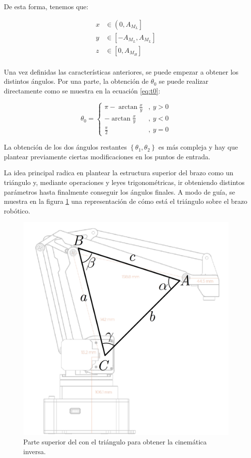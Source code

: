 De esta forma, tenemos que:

\begin{align*}
    x & \in \left(0, A_{M_L}\right]        \\
    y & \in \left[-A_{M_L}, A_{M_L}\right] \\
    z & \in \left[0, A_{M_H}\right]        \\
\end{align*}

Una vez definidas las características anteriores, se puede empezar a obtener los distintos
ángulos. Por una parte, la obtención de $\theta_0$ se puede realizar directamente como
se muestra en la ecuación \ref{eq:t0}:

\begin{equation}\label{eq:t0}
    \theta_0 = \left\{\begin{aligned}
        \pi - \arctan{\frac{x}{y}} & ,~y > 0 \\
        - \arctan{\frac{x}{y}}     & ,~y < 0 \\
        \frac{\pi}{2}              & ,~y = 0
    \end{aligned}
    \right.
\end{equation}

La obtención de los dos ángulos restantes $\left\{\theta_1, \theta_2\right\}$ es más
compleja y hay que plantear previamente ciertas modificaciones en los puntos de entrada.

La idea principal radica en plantear la estructura superior del brazo como un triángulo
y, mediante operaciones y leyes trigonométricas, ir obteniendo distintos parámetros hasta
finalmente conseguir los ángulos finales. A modo de guía, se muestra en la figura
\ref{fig:ik_over_arm} una representación de cómo está el triángulo sobre el brazo
robótico.

\begin{figure}[H]
    \centering
    \includegraphics[width=.5\linewidth]{pictures/ik_cosine_law_over_arm.png}
    \caption{Parte superior del \pArm{} con el triángulo para obtener la cinemática inversa.}
    \label{fig:ik_over_arm}
\end{figure}

